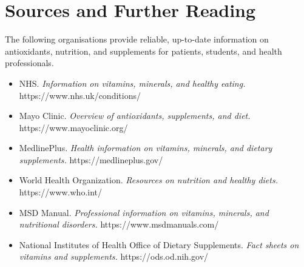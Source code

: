 \section*{Sources and Further Reading}
The following organisations provide reliable, up-to-date information on antioxidants, nutrition, and supplements for patients, students, and health professionals.

\begin{itemize}
    \item NHS. \textit{Information on vitamins, minerals, and healthy eating.} https://www.nhs.uk/conditions/
    \item Mayo Clinic. \textit{Overview of antioxidants, supplements, and diet.} https://www.mayoclinic.org/
    \item MedlinePlus. \textit{Health information on vitamins, minerals, and dietary supplements.} https://medlineplus.gov/
    \item World Health Organization. \textit{Resources on nutrition and healthy diets.} https://www.who.int/
    \item MSD Manual. \textit{Professional information on vitamins, minerals, and nutritional disorders.} https://www.msdmanuals.com/
    \item National Institutes of Health Office of Dietary Supplements. \textit{Fact sheets on vitamins and supplements.} https://ods.od.nih.gov/
\end{itemize}
